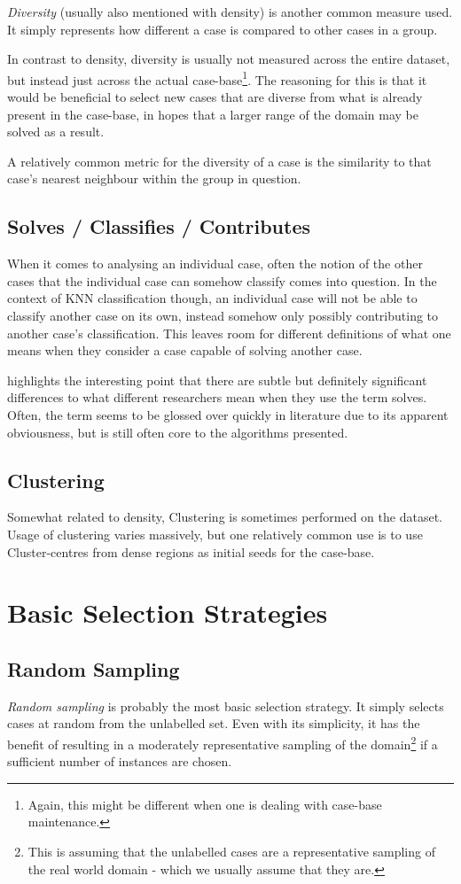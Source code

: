 \documentclass[a4paper,11pt]{report}
\begin{document}
\emph{Diversity} (usually also mentioned with density) is another common measure used. It simply represents how different a case is compared to other cases in a group.

In contrast to density, diversity is usually not measured across the entire dataset, but instead just across the actual case-base\footnote{Again, this might be different when one is dealing with case-base maintenance.}. The reasoning for this is that it would be beneficial to select new cases that are diverse from what is already present in the case-base, in hopes that a larger range of the domain may be solved as a result. 

A relatively common metric for the diversity of a case is the similarity to that case's nearest neighbour within the group in question.

\subsection{Solves / Classifies / Contributes}
When it comes to analysing an individual case, often the notion of the other cases that the individual case can somehow classify comes into question. In the context of KNN classification though, an individual case will not be able to classify another case on its own, instead somehow only possibly contributing to another case's classification. This leaves room for different definitions of what one means when they consider a case capable of solving another case. 

\citet{BridgeUpcoming} highlights the interesting point that there are subtle but definitely significant differences to what different researchers mean when they use the term solves. Often, the term seems to be glossed over quickly in literature due to its apparent obviousness, but is still often core to the algorithms presented.

\subsection{Clustering}
Somewhat related to density, Clustering is sometimes performed on the dataset. Usage of clustering varies massively, but one relatively common use is to use Cluster-centres from dense regions as initial seeds for the case-base.

\section{Basic Selection Strategies}
\subsection{Random Sampling}
\emph{Random sampling} is probably the most basic selection strategy. It simply selects cases at random from the unlabelled set. Even with its simplicity, it has the benefit of resulting in a moderately representative sampling of the domain\footnote{This is assuming that the unlabelled cases are a representative sampling of the real world domain - which we usually assume that they are.} if a sufficient number of instances are chosen.
\end{document}
